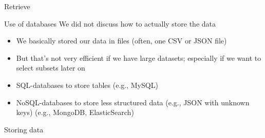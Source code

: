 \begin{frame}{Retrieve}
	\begin{block}{Use of databases \parencite{Guenther2018}}
		We did not discuss how to actually store the data
		\begin{itemize}
			\item We basically stored our data in files (often, one CSV or JSON file)
			\item But that's not very efficient if we have large datasets; especially if we want to select subsets later on
			\item SQL-databases to store tables (e.g., MySQL)
			\item NoSQL-databases to store less structured data (e.g., JSON with unknown keys) (e.g., MongoDB, ElasticSearch)
		\end{itemize}
	\end{block}
\end{frame}





\begin{frame}{Storing data}
\end{frame}




